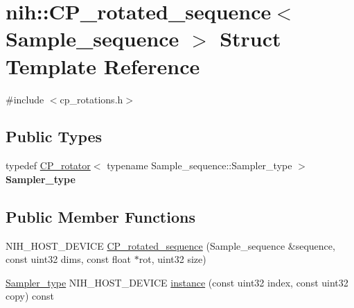 \hypertarget{structnih_1_1_c_p__rotated__sequence}{
\section{nih\-:\-:\-C\-P\-\_\-rotated\-\_\-sequence$<$ \-Sample\-\_\-sequence $>$ \-Struct \-Template \-Reference}
\label{structnih_1_1_c_p__rotated__sequence}
}


{\ttfamily \#include $<$cp\-\_\-rotations.\-h$>$}

\subsection*{\-Public \-Types}
\begin{DoxyCompactItemize}
\item 
\hypertarget{structnih_1_1_c_p__rotated__sequence_a28ebe66ab60419e73723ad3c108c93a9}{
typedef \hyperlink{structnih_1_1_c_p__rotator}{\-C\-P\-\_\-rotator}$<$ typename \*
\-Sample\-\_\-sequence\-::\-Sampler\-\_\-type $>$ {\bfseries \-Sampler\-\_\-type}}
\label{structnih_1_1_c_p__rotated__sequence_a28ebe66ab60419e73723ad3c108c93a9}

\end{DoxyCompactItemize}
\subsection*{\-Public \-Member \-Functions}
\begin{DoxyCompactItemize}
\item 
\-N\-I\-H\-\_\-\-H\-O\-S\-T\-\_\-\-D\-E\-V\-I\-C\-E \hyperlink{structnih_1_1_c_p__rotated__sequence_a660231532d529c38aeb9827ea20d5637}{\-C\-P\-\_\-rotated\-\_\-sequence} (\-Sample\-\_\-sequence \&sequence, const uint32 dims, const float $\ast$rot, uint32 size)
\item 
\hyperlink{structnih_1_1_c_p__rotator}{\-Sampler\-\_\-type} \-N\-I\-H\-\_\-\-H\-O\-S\-T\-\_\-\-D\-E\-V\-I\-C\-E \hyperlink{structnih_1_1_c_p__rotated__sequence_a825ebb2e498eabafb7313bfc07e28b74}{instance} (const uint32 index, const uint32 copy) const 
\end{DoxyCompactItemize}
